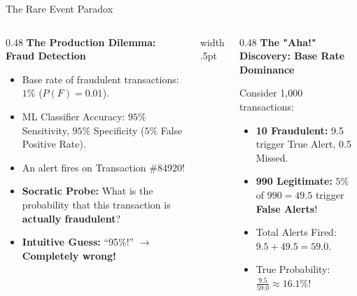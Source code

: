 \documentclass[../m00-session-03.tex]{subfiles}
\begin{document}
\begin{frame}[fragile]{The Rare Event Paradox}
  \begin{columns}[T,onlytextwidth]
    \begin{column}{0.48\textwidth}
      {\small\bfseries\color{UpGradRed}The Production Dilemma: Fraud Detection}\par\vspace{0.08cm}
      \begin{itemize}\setlength{\itemsep}{0.20em}\small
        \item Base rate of fraudulent transactions: $1\%$ ($P(F) = 0.01$).
        \item ML Classifier Accuracy: $95\%$ Sensitivity, $95\%$ Specificity ($5\%$ False Positive Rate).
        \item An alert fires on Transaction \#84920!
        \item \textcolor{UpGradRed}{\textbf{Socratic Probe:}} What is the probability that this transaction is \textbf{actually fraudulent}?
        \item \textbf{Intuitive Guess:} ``95\%!'' $\to$ \textcolor{UpGradRed}{\textbf{Completely wrong!}}
      \end{itemize}
    \end{column}
    \hfill{\color{UpGradRule}\vrule width .5pt}\hfill
    \begin{column}{0.48\textwidth}
      {\small\bfseries\color{AWSEmerald}The "Aha!" Discovery: Base Rate Dominance}\par\vspace{0.08cm}
      Consider 1,000 transactions:
      \begin{itemize}\setlength{\itemsep}{0.18em}\small
        \item \textbf{10 Fraudulent:} 9.5 trigger True Alert, 0.5 Missed.
        \item \textbf{990 Legitimate:} $5\%$ of $990 = \mathbf{49.5}$ trigger \textbf{False Alerts}!
        \item Total Alerts Fired: $9.5 + 49.5 = \mathbf{59.0}$.
        \item True Probability: $\frac{9.5}{59.0} \approx \mathbf{16.1\%}$!
      \end{itemize}
      \vspace{0.04cm}
    \end{column}
  \end{columns}
\end{frame}
\end{document}
